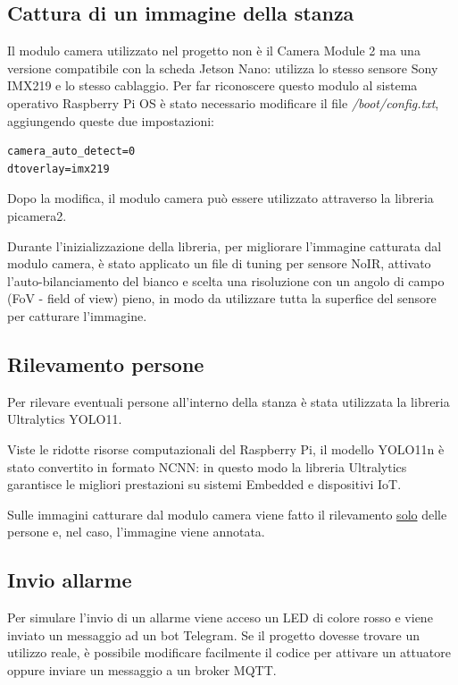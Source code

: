 \documentclass[italian,12pt,a4paper,oneside,final]{report}
\begin{document}
\subsection{Cattura di un immagine della stanza}
Il modulo camera utilizzato nel progetto non è il Camera Module 2 ma una versione compatibile con la scheda Jetson Nano: utilizza lo stesso sensore Sony IMX219 e lo stesso cablaggio.
Per far riconoscere questo modulo al sistema operativo Raspberry Pi OS è stato necessario modificare il file \textit{/boot/config.txt}, aggiungendo queste due impostazioni:
\begin{lstlisting}
camera_auto_detect=0
dtoverlay=imx219
\end{lstlisting}
Dopo la modifica, il modulo camera può essere utilizzato attraverso la libreria picamera2.

Durante l'inizializzazione della libreria, per migliorare l'immagine catturata dal modulo camera, è stato applicato un file di tuning per sensore NoIR, attivato l'auto-bilanciamento del bianco e scelta una risoluzione con un angolo di campo (FoV - field of view) pieno, in modo da utilizzare tutta la superfice del sensore per catturare l'immagine. 

\subsection{Rilevamento persone}
Per rilevare eventuali persone all'interno della stanza è stata utilizzata la libreria Ultralytics YOLO11.

Viste le ridotte risorse computazionali del Raspberry Pi, il modello YOLO11n è stato convertito in formato NCNN: in questo modo la libreria Ultralytics garantisce le migliori prestazioni su sistemi Embedded e dispositivi IoT.

Sulle immagini catturare dal modulo camera viene fatto il rilevamento \underline{solo} delle persone e, nel caso, l'immagine viene annotata.

\subsection{Invio allarme}
Per simulare l'invio di un allarme viene acceso un LED di colore rosso e viene inviato un messaggio ad un bot Telegram. 
Se il progetto dovesse trovare un utilizzo reale, è possibile modificare facilmente il codice per attivare un attuatore oppure inviare un messaggio a un broker MQTT.
\end{document}
